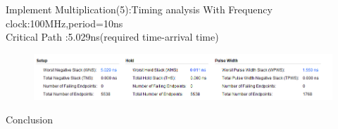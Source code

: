 \documentclass[11pt]{beamer}
\begin{document}
\begin{frame}[t]{Implement Multiplication(5):Timing analysis}
With Frequency clock:100MHz,period=10ns\\
Critical Path :5.029ns(required time-arrival time)
\begin{center}
    \begin{figure}[htp]
    \begin{center}
     \includegraphics[scale=.37]{image/fig16}
    \end{center}
    \label{reffig16}
    \end{figure}
\end{center}
\end{frame}
\begin{frame}{Conclusion}

\end{frame}
\end{document}

